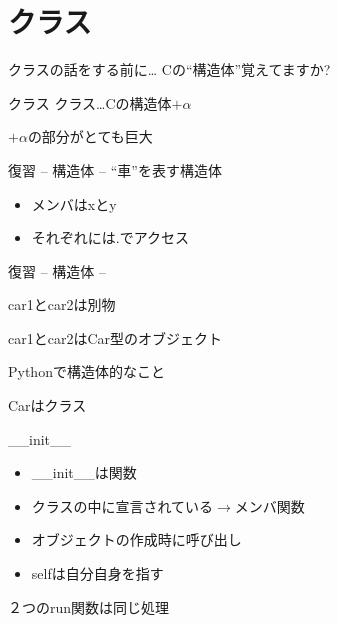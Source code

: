\documentclass[12pt, xetex, xcolor=pdftex, dvipsnames]{beamer}
\begin{document}
\section{クラス}
\begin{frame}{クラスの話をする前に\dots}
    Cの{\Large ``構造体''}覚えてますか?
\end{frame}
\begin{frame}{クラス}
    クラス\dots Cの構造体{\Huge\alert{$+\alpha$}}

    \pause
    $+\alpha$の部分がとても巨大
\end{frame}
\begin{frame}[fragile]{復習 -- 構造体 --}
    ``車''を表す構造体

    

    \begin{itemize}
        \item メンバはxとy
        \item それぞれには.でアクセス
    \end{itemize}
\end{frame}
\begin{frame}[fragile]{復習 -- 構造体 --}
    

    car1とcar2は別物

    \pause
    car1とcar2はCar型のオブジェクト
\end{frame}
\begin{frame}[fragile]{Pythonで構造体的なこと}
    
    Carはクラス
\end{frame}
\begin{frame}{\_\_init\_\_}
    

    \begin{itemize}
        \item \_\_init\_\_は関数
        \item クラスの中に宣言されている$\rightarrow$メンバ関数
        \item オブジェクトの作成時に呼び出し
        \item selfは自分自身を指す
    \end{itemize}
\end{frame}
\begin{frame}[fragile]{２つのrun関数は同じ処理}
    
\end{frame}
\end{document}

